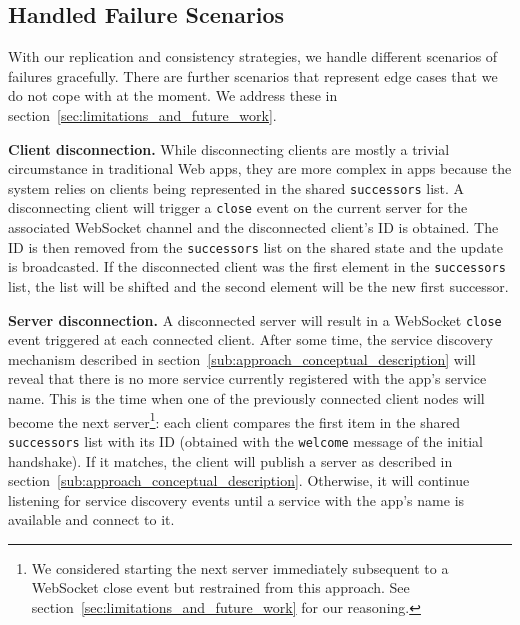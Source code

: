 \subsection{Handled Failure Scenarios}
\label{sub:approach_handled_failure_scenarios}

With our replication and consistency strategies, we handle different scenarios of failures gracefully. There are further scenarios that represent edge cases that we do not cope with at the moment. 
We address these in section~\ref{sec:limitations_and_future_work}.

\textbf{Client disconnection.} 
While disconnecting clients are mostly a trivial circumstance in traditional Web apps, they are more complex in \APIshort apps because the system relies on clients being represented in the shared \texttt{successors} list. 
A disconnecting client will trigger a \texttt{close} event on the current server for the associated WebSocket channel and the disconnected client's ID is obtained. 
The ID is then removed from the \texttt{successors} list on the shared state and the update is broadcasted. 
If the disconnected client was the first element in the \texttt{successors} list, the list will be shifted and the second element will be the new first successor.

\textbf{Server disconnection.} 
A disconnected server will result in a WebSocket \texttt{close} event triggered at each connected client. 
After some time, the service discovery mechanism described in section~\ref{sub:approach_conceptual_description} will reveal that there is no more service currently registered with the app's service name. 
This is the time when one of the previously connected client nodes will become the next server\footnote{We considered starting the next server immediately subsequent to a WebSocket close event but restrained from this approach. 
See section~\ref{sec:limitations_and_future_work} for our reasoning.}: each client compares the first item in the shared \texttt{successors} list with its ID (obtained with the \texttt{welcome} message of the initial handshake). 
If it matches, the client will publish a server as described in section~\ref{sub:approach_conceptual_description}. 
Otherwise, it will continue listening for service discovery events until a service with the app's name is available and connect to it.

